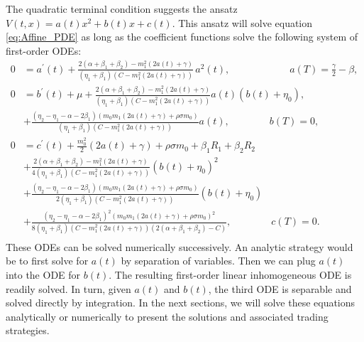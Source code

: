 \documentclass[12pt, letterpaper]{article}
\numberwithin{equation}{section}
\numberwithin{theorem}{section}
\begin{document}
The quadratic terminal condition suggests the ansatz $V(t,x)=a(t)x^2+b(t)x+c(t)$. This ansatz will solve equation \eqref{eq:Affine_PDE} as long as the coefficient functions solve the following system of first-order ODEs:
\begin{equation}\label{eq:ODE_system}
\begin{aligned}
0&=a^\prime(t)+\frac{2(\alpha+\beta_1+\beta_2)-m_1^2(2a(t)+\gamma)}{(\eta_1+\beta_1)(C-m_1^2(2a(t)+\gamma))}\,a^2(t), \qquad\qquad\qquad a(T)=\frac{\gamma}{2}-\beta, \\
0&=b^\prime(t)+\mu+\frac{2(\alpha+\beta_1+\beta_2)-m_1^2(2a(t)+\gamma)}{(\eta_1+\beta_1)(C-m_1^2(2a(t)+\gamma))}a(t)(b(t)+\eta_0), \\
&+\frac{(\eta_2-\eta_1-\alpha-2\beta_1)(m_0m_1(2a(t)+\gamma)+\rho\sigma m_0)}{(\eta_1+\beta_1)(C-m_1^2(2a(t)+\gamma))}a(t),\qquad\qquad b(T)=0,\\
0&=c^\prime(t)+\frac{m_0^2}{2}(2a(t)+\gamma)+\rho\sigma m_0+\beta_1R_1+\beta_2R_2\\
&+\frac{2(\alpha+\beta_1+\beta_2)-m_1^2(2a(t)+\gamma)}{4(\eta_1+\beta_1)(C-m_1^2(2a(t)+\gamma))}(b(t)+\eta_0)^2\\
&+\frac{(\eta_2-\eta_1-\alpha-2\beta_1)(m_0m_1(2a(t)+\gamma)+\rho\sigma m_0)}{2(\eta_1+\beta_1)(C-m_1^2(2a(t)+\gamma))}(b(t)+\eta_0)\\
&+\frac{(\eta_2-\eta_1-\alpha-2\beta_1)^2(m_0m_1(2a(t)+\gamma)+\rho\sigma m_0)^2}{8(\eta_1+\beta_1)(C-m_1^2(2a(t)+\gamma))(2(\alpha+\beta_1+\beta_2)-C)},\qquad\qquad c(T)=0.\\
\end{aligned}
\end{equation} These ODEs can be solved numerically successively. An analytic strategy would be to first solve for $a(t)$ by separation of variables. Then we can plug $a(t)$ into the ODE for $b(t)$. The resulting  first-order linear inhomogeneous ODE is readily solved. In turn, given $a(t)$ and $b(t)$, the third ODE is separable and solved directly by integration.   In the next sections, we will solve these equations analytically or numerically to present  the solutions and associated trading strategies.
\end{document}
